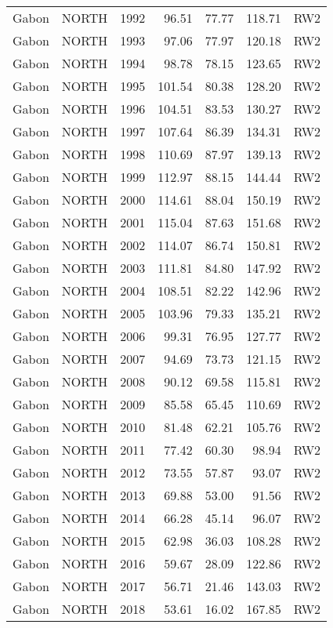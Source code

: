 \begin{longtable}{lllrrrl}
  Gabon & NORTH & 1992 & 96.51 & 77.77 & 118.71 & RW2 \\ 
  Gabon & NORTH & 1993 & 97.06 & 77.97 & 120.18 & RW2 \\ 
  Gabon & NORTH & 1994 & 98.78 & 78.15 & 123.65 & RW2 \\ 
  Gabon & NORTH & 1995 & 101.54 & 80.38 & 128.20 & RW2 \\ 
  Gabon & NORTH & 1996 & 104.51 & 83.53 & 130.27 & RW2 \\ 
  Gabon & NORTH & 1997 & 107.64 & 86.39 & 134.31 & RW2 \\ 
  Gabon & NORTH & 1998 & 110.69 & 87.97 & 139.13 & RW2 \\ 
  Gabon & NORTH & 1999 & 112.97 & 88.15 & 144.44 & RW2 \\ 
  Gabon & NORTH & 2000 & 114.61 & 88.04 & 150.19 & RW2 \\ 
  Gabon & NORTH & 2001 & 115.04 & 87.63 & 151.68 & RW2 \\ 
  Gabon & NORTH & 2002 & 114.07 & 86.74 & 150.81 & RW2 \\ 
  Gabon & NORTH & 2003 & 111.81 & 84.80 & 147.92 & RW2 \\ 
  Gabon & NORTH & 2004 & 108.51 & 82.22 & 142.96 & RW2 \\ 
  Gabon & NORTH & 2005 & 103.96 & 79.33 & 135.21 & RW2 \\ 
  Gabon & NORTH & 2006 & 99.31 & 76.95 & 127.77 & RW2 \\ 
  Gabon & NORTH & 2007 & 94.69 & 73.73 & 121.15 & RW2 \\ 
  Gabon & NORTH & 2008 & 90.12 & 69.58 & 115.81 & RW2 \\ 
  Gabon & NORTH & 2009 & 85.58 & 65.45 & 110.69 & RW2 \\ 
  Gabon & NORTH & 2010 & 81.48 & 62.21 & 105.76 & RW2 \\ 
  Gabon & NORTH & 2011 & 77.42 & 60.30 & 98.94 & RW2 \\ 
  Gabon & NORTH & 2012 & 73.55 & 57.87 & 93.07 & RW2 \\ 
  Gabon & NORTH & 2013 & 69.88 & 53.00 & 91.56 & RW2 \\ 
  Gabon & NORTH & 2014 & 66.28 & 45.14 & 96.07 & RW2 \\ 
  Gabon & NORTH & 2015 & 62.98 & 36.03 & 108.28 & RW2 \\ 
  Gabon & NORTH & 2016 & 59.67 & 28.09 & 122.86 & RW2 \\ 
  Gabon & NORTH & 2017 & 56.71 & 21.46 & 143.03 & RW2 \\ 
  Gabon & NORTH & 2018 & 53.61 & 16.02 & 167.85 & RW2 \\ 

\end{longtable}
